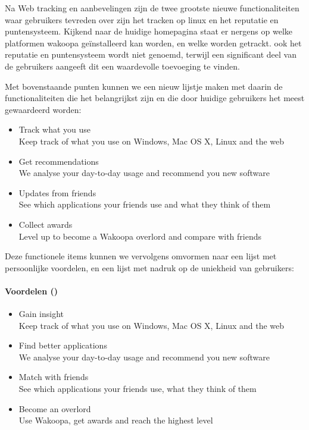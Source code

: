Na Web tracking en aanbevelingen zijn de twee grootste nieuwe functionaliteiten waar gebruikers tevreden over zijn het tracken op linux en het reputatie en puntensysteem. Kijkend naar de huidige homepagina staat er nergens op welke platformen wakoopa ge\"installeerd kan worden, en welke worden getrackt. ook het reputatie en puntensysteem wordt niet genoemd, terwijl een significant deel van de gebruikers aangeeft dit een waardevolle toevoeging te vinden.

Met bovenstaande punten kunnen we een nieuw lijstje maken met daarin de functionaliteiten die het belangrijkst zijn en die door huidige gebruikers het meest gewaardeerd worden:
\begin{itemize}
    \item{Track what you use\\
      Keep track of what you use on Windows, Mac OS X, Linux and the web}

    \item{Get recommendations\\
      We analyse your day-to-day usage and recommend you new software}

    \item{Updates from friends\\
      See which applications your friends use and what they think of them}

    \item{Collect awards\\
      Level up to become a Wakoopa overlord and compare with friends}
\end{itemize}

Deze functionele items kunnen we vervolgens omvormen naar een lijst met persoonlijke voordelen, en een lijst met nadruk op de uniekheid van gebruikers:

\paragraph{Voordelen (\citet{Hoekman2008}) }
\begin{itemize}
    \item{Gain insight\\
      Keep track of what you use on Windows, Mac OS X, Linux and the web}

    \item{Find better applications\\
      We analyse your day-to-day usage and recommend you new software}

    \item{Match with friends\\
      See which applications your friends use, what they think of them}

    \item{Become an overlord\\
      Use Wakoopa, get awards and reach the highest level}
\end{itemize}
